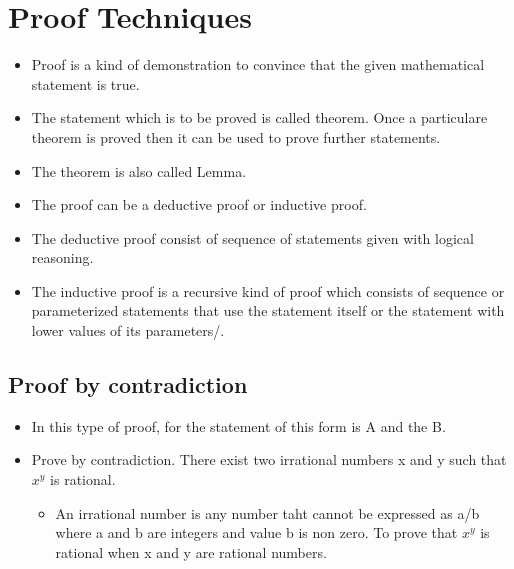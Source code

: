 \documentclass{article}
\begin{document}
\section{Proof Techniques}
\begin{itemize}
	\item Proof is a kind of demonstration to convince that the given mathematical statement is true.
	\item The statement which is to be proved is called theorem. Once a particulare theorem is proved then it can be used to prove further statements.
	\item The theorem is also called Lemma.
	\item The proof can be a deductive proof or inductive proof.
	\item The deductive proof consist of sequence of statements given with logical reasoning.
	\item The inductive proof is a recursive kind of proof which consists of sequence or parameterized statements that use the statement itself or the statement with lower values of its parameters/.
\end{itemize}
\subsection{Proof by contradiction}
\begin{itemize}
	\item In this type of proof, for the statement of this form is A and the B. 
	\item Prove by contradiction. There exist two irrational numbers x and y such that $x^y$ is rational.
	\begin{itemize}
		\item An irrational number is any number taht cannot be expressed as a/b where a and b are integers and value b is non zero. To prove that $x^y$ is rational when x and y are rational numbers.
		
	\end{itemize}
\end{itemize}
\end{document}
